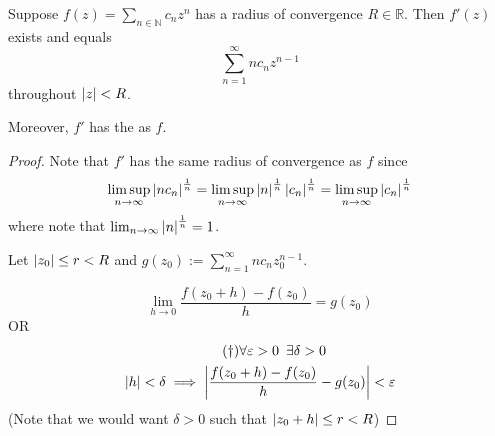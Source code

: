 \documentclass[notoc,notitlepage]{tufte-book}
\begin{document}
\begin{thm}\label{thm:power_function_holomorphic_function_region_of_convergence}
	Suppose $f(z) = \sum_{n\in \mathbb{N}} c_n z^n$ has a radius of convergence $R \in \mathbb{R}$. Then $f'(z)$ exists and equals
	\begin{equation*}
		\sum_{n=1}^{\infty} nc_nz^{n - 1}
	\end{equation*}
	throughout $\left|z\right| < R$.

	Moreover, $f'$ has the  as $f$.
\end{thm}

\begin{proof}
	Note that $f'$ has the same radius of convergence as $f$ since
	\begin{equation*}
		\limsup_{n \to \infty} \left|nc_n\right|^\frac{1}{n} = \limsup_{n \to \infty} \left|n\right|^\frac{1}{n} \left|c_n\right|^\frac{1}{n} = \limsup_{n \to \infty} \left|c_n\right|^\frac{1}{n}
	\end{equation*}
	where note that $\lim_{n \to \infty} \left|n\right|^\frac{1}{n} = 1$.

	Let $\left|z_0\right| \leq r < R$ and $g(z_0) := \sum_{n=1}^{\infty} nc_n z_0^{n - 1} $.

	\WTS
	\begin{equation*}
		\lim_{h \to 0} \frac{f(z_0 + h) - f(z_0)}{h} = g(z_0)
	\end{equation*}
	OR
	\begin{gather*}\label{eq:power_function_defines_holomorphic_function_epsilondelta}\tag{$\dagger$}
		\forall \varepsilon > 0 \enspace \exists \delta > 0 \\
		\left|h\right| < \delta \implies \left|\frac{f(z_0 + h) - f(z_0)}{h} -g(z_0)\right| < \varepsilon
	\end{gather*}
	(Note that we would want $\delta > 0$ such that $\left|z_0 + h\right| \leq r < R$)


\end{proof}
\end{document}
